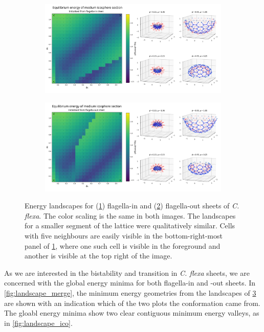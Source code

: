 \begin{figure}
	\centering
	\begin{subfigure}[b]{\textwidth}
		\centering
		\includegraphics[width=\textwidth]{landscape_ico3.png}
		\caption{}
		\label{subfig:landscape_ico3}
	\end{subfigure}
	\begin{subfigure}[b]{\textwidth}
		\centering
		\includegraphics[width=\textwidth]{landscape_ico3r.png}
		\caption{}
		\label{subfig:landscape_ico3r}
	\end{subfigure}
	\caption[Energy landscape for flagella-in and flagella-out curved sheets]{Energy landscapes for (\ref{subfig:landscape_ico3}) flagella-in and (\ref{subfig:landscape_ico3r}) flagella-out sheets of \textit{C. flexa}. The color scaling is the same in both images. The landscapes for a smaller segment of the lattice were qualitatively similar. Cells with five neighbours are easily visible in the bottom-right-most panel of \ref{subfig:landscape_ico3}, where one such cell is visible in the foreground and another is visible at the top right of the image.}
	\label{fig:landscape_ico3}
\end{figure}

As we are interested in the bistability and transition in \textit{C. flexa} sheets, we are concerned with the global energy minima for both flagella-in and -out sheets. 
In \cref{fig:landscape_merge}, the minimum energy geometries from the landscapes of \cref{fig:landscape_ico3} are shown with an indication which of the two plots the conformation came from.
The gloabl energy minima show two clear contiguous minimum energy valleys, as in \cref{fig:landscape_ico}.

